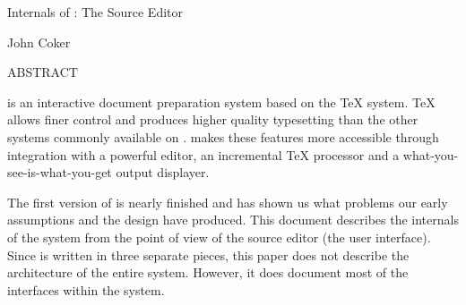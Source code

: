 \indent\vskip1.5in
\centerline{\fourteenbf Internals of \VorTeX: The Source Editor}
\bigskip
\centerline{\twelvebf John Coker}
\bigskip\bigskip

\centerline{\tenbf ABSTRACT}
\medskip
{\narrower\narrower

\noindent {\VorTeX} is an interactive document preparation system
based on the {\TeX} system. {\TeX} allows finer control and produces
higher quality typesetting than the other systems commonly available
on {\UNIX}.  {\VorTeX} makes these features more accessible through
integration with a powerful editor, an incremental {\TeX} processor
and a what-you-see-is-what-you-get output displayer.

The first version of {\VorTeX} is nearly finished and has
shown us what problems our early assumptions and the design have
produced.  This document describes the internals of the system from
the point of view of the {\VorTeX} source editor (the user interface).
Since {\VorTeX} is written in three separate pieces, this paper does
not describe the architecture of the entire system.  However, it
does document most of the interfaces within the system.
\par}

\newpage
